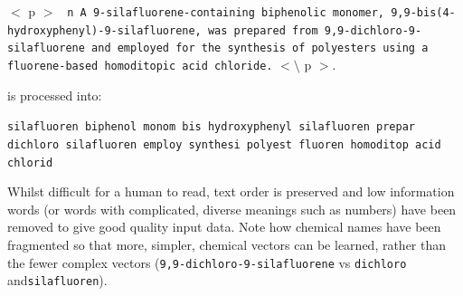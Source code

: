 $<$ p $>$
\texttt{ n A 9-silafluorene-containing biphenolic monomer, 9,9-bis(4-hydroxyphenyl)-9-silafluorene, was prepared from 9,9-dichloro-9-silafluorene and employed for the synthesis of polyesters using a fluorene-based homoditopic acid chloride.} $< \setminus$ p $>$.
\cite{sanex} 

is processed into:

\texttt{silafluoren biphenol monom bis hydroxyphenyl silafluoren prepar dichloro silafluoren employ synthesi polyest fluoren homoditop acid chlorid}

Whilst difficult for a human to read, text order is preserved and low information words (or words with complicated, diverse meanings such as numbers) have been removed to give good quality input data. Note how chemical names have been fragmented so that more, simpler, chemical vectors can be learned, rather than the fewer complex vectors (\texttt{9,9-dichloro-9-silafluorene} vs \texttt{dichloro} and\texttt{silafluoren}).

